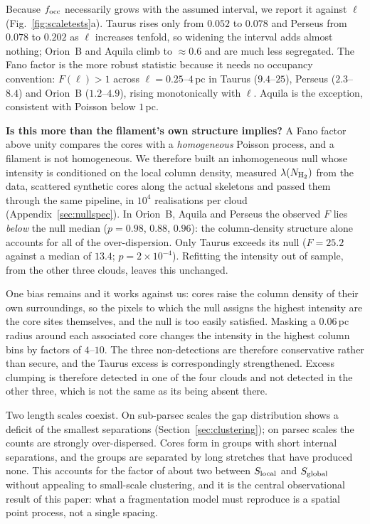 \documentclass[usenatbib,twoside,twocolumn]{mnras}
\begin{document}
Because $f_{\rm occ}$ necessarily grows with the assumed interval, we report it against $\ell$ (Fig.~\ref{fig:scaletests}a). Taurus rises only from $0.052$ to $0.078$ and Perseus from $0.078$ to $0.202$ as $\ell$ increases tenfold, so widening the interval adds almost nothing; Orion~B and Aquila climb to $\approx0.6$ and are much less segregated. The Fano factor is the more robust statistic because it needs no occupancy convention: $F(\ell)>1$ across $\ell=0.25$--$4$\,pc in Taurus ($9.4$--$25$), Perseus ($2.3$--$8.4$) and Orion~B ($1.2$--$4.9$), rising monotonically with $\ell$. Aquila is the exception, consistent with Poisson below $1$\,pc.

\smallskip\noindent\textbf{Is this more than the filament's own structure implies?} A Fano factor above unity compares the cores with a \emph{homogeneous} Poisson process, and a filament is not homogeneous. We therefore built an inhomogeneous null whose intensity is conditioned on the local column density, measured $\lambda(N_{\rm H_2})$ from the data, scattered synthetic cores along the actual skeletons and passed them through the same pipeline, in $10^4$ realisations per cloud (Appendix~\ref{sec:nullspec}). In Orion~B, Aquila and Perseus the observed $F$ lies \emph{below} the null median ($p=0.98$, $0.88$, $0.96$): the column-density structure alone accounts for all of the over-dispersion. Only Taurus exceeds its null ($F=25.2$ against a median of $13.4$; $p=2\times10^{-4}$). Refitting the intensity out of sample, from the other three clouds, leaves this unchanged.

One bias remains and it works against us: cores raise the column density of their own surroundings, so the pixels to which the null assigns the highest intensity are the core sites themselves, and the null is too easily satisfied. Masking a $0.06$\,pc radius around each associated core changes the intensity in the highest column bins by factors of $4$--$10$. The three non-detections are therefore conservative rather than secure, and the Taurus excess is correspondingly strengthened. Excess clumping is therefore detected in one of the four clouds and not detected in the other three, which is not the same as its being absent there.

Two length scales coexist. On sub-parsec scales the gap distribution shows a deficit of the smallest separations (Section~\ref{sec:clustering}); on parsec scales the counts are strongly over-dispersed. Cores form in groups with short internal separations, and the groups are separated by long stretches that have produced none. This accounts for the factor of about two between $S_{\rm local}$ and $S_{\rm global}$ without appealing to small-scale clustering, and it is the central observational result of this paper: what a fragmentation model must reproduce is a spatial point process, not a single spacing.
\end{document}
